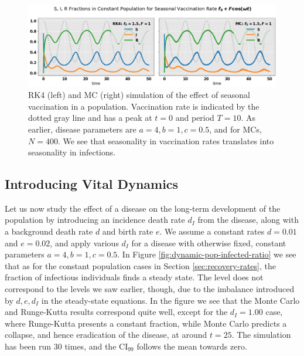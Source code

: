 \documentclass[]{article}
\begin{document}
\begin{figure}[!h]
	\centering
	\includegraphics[width=1\linewidth]{./figs/seasonal-vaccination-rate.png}
	\caption{RK4 (left) and MC (right) simulation of the effect of seasonal vaccination in a population. Vaccination rate is indicated by the dotted gray line and has a peak at $t=0$ and period $T=10$. As earlier, disease parameters are $a=4, b= 1, c=0.5$, and for MCs, $N=400$. We see that seasonality in vaccination rates translates into seasonality in infections.}
	\label{fig:seasonal-vaccination-rate}
\end{figure}


\subsection{Introducing Vital Dynamics} \label{sec:vital-dynamics}

Let us now study the effect of a disease on the long-term development of the population by introducing an incidence death rate $d_I$ from the disease, along with a background death rate $d$ and birth rate $e$. We assume a constant rates $d=0.01$ and $e=0.02$, and apply various $d_I$ for a disease with otherwise fixed, constant parameters $a=4, b=1, c=0.5$. In Figure \ref{fig:dynamic-pop-infected-ratio} we see that as for the constant population cases in Section \ref{sec:recovery-rates}, the fraction of infectious individuals finds a steady state. The level does not correspond to the levels we saw earlier, though, due to the imbalance introduced by $d, e, d_I$ in the steady-state equations. In the figure we see that the Monte Carlo and Runge-Kutta results correspond quite well, except for the $d_I = 1.00$ case, where Runge-Kutta presents a constant fraction, while Monte Carlo predicts a collapse, and hence eradication of the disease, at around $t=25$. The simulation has been run 30 times, and the CI$_{99}$ follows the mean towards zero.
\end{document}
